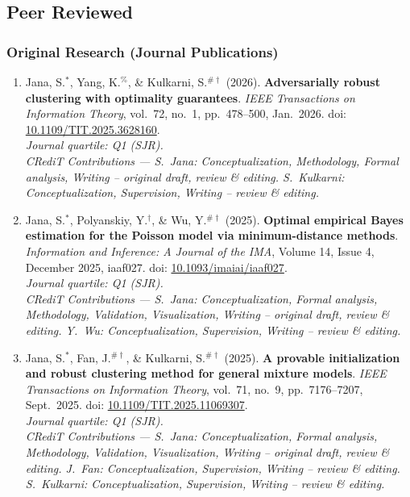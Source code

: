 \documentclass[letterpaper,oneside]{article}
\begin{document}
\subsection*{Peer Reviewed}

\subsubsection*{Original Research (Journal Publications)}

\begin{enumerate}[leftmargin=*,label=J\arabic*.]

  \item Jana, S.$^*$, Yang, K.$^\%$, \& Kulkarni, S.$^{\#\dagger}$ (2026). \textbf{Adversarially robust clustering with optimality guarantees}. \textit{IEEE Transactions on Information Theory}, vol.\ 72, no.\ 1, pp.\ 478--500, Jan.\ 2026. doi: \href{https://doi.org/10.1109/TIT.2025.3628160}{10.1109/TIT.2025.3628160}.\\
  \textit{Journal quartile: Q1 (SJR).}\\
  \textit{CRediT Contributions --- S.~Jana: Conceptualization, Methodology, Formal analysis, Writing -- original draft, review \& editing. S.~Kulkarni: Conceptualization, Supervision, Writing -- review \& editing.}

  \item Jana, S.$^*$, Polyanskiy, Y.$^{\dagger}$, \& Wu, Y.$^{\#\dagger}$ (2025). \textbf{Optimal empirical Bayes estimation for the Poisson model via minimum-distance methods}. \textit{Information and Inference: A Journal of the IMA}, Volume 14, Issue 4, December 2025, iaaf027. doi: \href{https://doi.org/10.1093/imaiai/iaaf027}{10.1093/imaiai/iaaf027}.\\
  \textit{Journal quartile: Q1 (SJR).}\\
  \textit{CRediT Contributions --- S.~Jana: Conceptualization, Formal analysis, Methodology, Validation, Visualization, Writing -- original draft, review \& editing. Y.~Wu: Conceptualization, Supervision, Writing -- review \& editing.}

  \item Jana, S.$^*$, Fan, J.$^{\#\dagger}$, \& Kulkarni, S.$^{\#\dagger}$ (2025). {\textbf{A provable initialization and robust clustering method for general mixture models}}. \textit{IEEE Transactions on Information Theory}, vol.\ 71, no.\ 9, pp.\ 7176--7207, Sept.\ 2025. doi: \href{https://doi.org/10.1109/TIT.2025.3585804}{10.1109/TIT.2025.11069307}.\\
  \textit{Journal quartile: Q1 (SJR).}\\
  \textit{CRediT Contributions --- S.~Jana: Conceptualization, Formal analysis, Methodology, Validation, Visualization, Writing -- original draft, review \& editing. J.~Fan: Conceptualization, Supervision, Writing -- review \& editing. S.~Kulkarni: Conceptualization, Supervision, Writing -- review \& editing.}


\end{enumerate}
\end{document}
